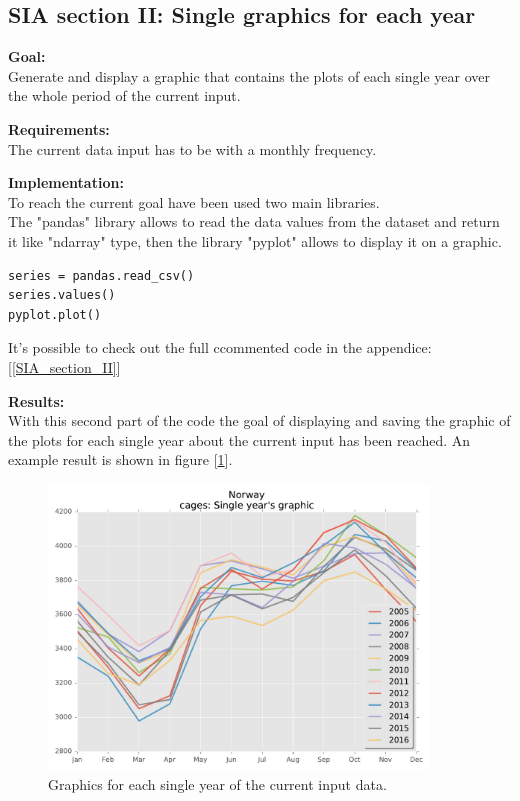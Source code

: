\newpage
\subsection{SIA section II: Single graphics for each year}

\textbf{Goal:}\\
Generate and display a graphic that contains the plots of each single year over the whole period of the current input. 

\textbf{Requirements:}\\
The current data input has to be with a monthly frequency. 

\textbf{Implementation:}\\
To reach the current goal have been used two main libraries.\\
The "pandas" library allows to read the data values from the dataset and return it like "ndarray" type, then the library "pyplot" allows to display it on a graphic.
\begin{lstlisting}
series = pandas.read_csv()
series.values()
pyplot.plot()
\end{lstlisting}

It's possible to check out the full ccommented code in the appendice: [\ref{SIA_section_II}]

\textbf{Results:} \\
With this second part of the code the goal of displaying and saving the graphic of the plots for each single year about the current input has been reached. An example result is shown in figure [\ref{Years_graphic}].
\begin{figure}[H]
	\centering
    \includegraphics[width=0.9\textwidth]{Files/Cages_Years.pdf}
    \caption{Graphics for each single year of the current input data.}
    \label{Years_graphic}
\end{figure}




